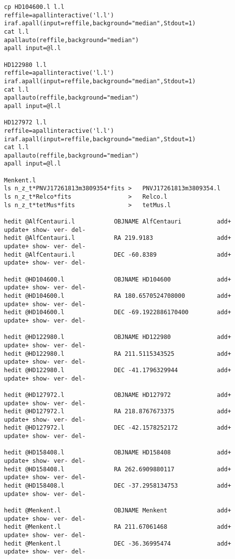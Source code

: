 \begin{verbatim}
cp HD104600.l l.l
reffile=apallinteractive('l.l')
iraf.apall(input=reffile,background="median",Stdout=1)
cat l.l
apallauto(reffile,background="median")
apall input=@l.l

HD122980 l.l
reffile=apallinteractive('l.l')
iraf.apall(input=reffile,background="median",Stdout=1)
cat l.l
apallauto(reffile,background="median")
apall input=@l.l

HD127972 l.l
reffile=apallinteractive('l.l')
iraf.apall(input=reffile,background="median",Stdout=1)
cat l.l
apallauto(reffile,background="median")
apall input=@l.l

Menkent.l
ls n_z_t*PNVJ17261813m3809354*fits >   PNVJ17261813m3809354.l
ls n_z_t*Relco*fits                >   Relco.l
ls n_z_t*tetMus*fits               >   tetMus.l                

hedit @AlfCentauri.l           OBJNAME AlfCentauri          add+ update+ show- ver- del-
hedit @AlfCentauri.l           RA 219.9183                  add+ update+ show- ver- del-
hedit @AlfCentauri.l           DEC -60.8389                 add+ update+ show- ver- del-

hedit @HD104600.l              OBJNAME HD104600             add+ update+ show- ver- del-
hedit @HD104600.l              RA 180.6570524708000         add+ update+ show- ver- del-
hedit @HD104600.l              DEC -69.1922886170400        add+ update+ show- ver- del-

hedit @HD122980.l              OBJNAME HD122980             add+ update+ show- ver- del-
hedit @HD122980.l              RA 211.5115343525            add+ update+ show- ver- del-
hedit @HD122980.l              DEC -41.1796329944           add+ update+ show- ver- del-

hedit @HD127972.l              OBJNAME HD127972             add+ update+ show- ver- del-
hedit @HD127972.l              RA 218.8767673375            add+ update+ show- ver- del-
hedit @HD127972.l              DEC -42.1578252172           add+ update+ show- ver- del-

hedit @HD158408.l              OBJNAME HD158408             add+ update+ show- ver- del-
hedit @HD158408.l              RA 262.6909880117            add+ update+ show- ver- del-
hedit @HD158408.l              DEC -37.2958134753           add+ update+ show- ver- del-

hedit @Menkent.l               OBJNAME Menkent              add+ update+ show- ver- del- 
hedit @Menkent.l               RA 211.67061468              add+ update+ show- ver- del-
hedit @Menkent.l               DEC -36.36995474             add+ update+ show- ver- del-


\end{verbatim}

